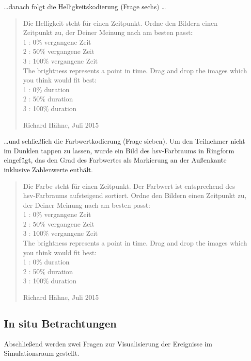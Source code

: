 \ldots danach folgt die Helligkeitskodierung (Frage sechs) \ldots
\blockquote[Richard Hähne, Juli 2015]{
Die Helligkeit steht für einen Zeitpunkt. Ordne den Bildern einen Zeitpunkt zu, der Deiner Meinung nach am besten passt:\\
1 : 0\% vergangene Zeit\\
2 : 50\% vergangene Zeit\\
3 : 100\% vergangene Zeit\\

The brightness represents a point in time. Drag and drop the images which you think would fit best:\\
1 : 0\% duration\\
2 : 50\% duration\\
3 : 100\% duration

}

\ldots und schließlich die Farbwertkodierung (Frage sieben). Um den Teilnehmer nicht im Dunklen tappen zu lassen, wurde ein Bild des \gls{hsv}-Farbraums in Ringform eingefügt, das den Grad des Farbwertes als Markierung an der Außenkante inklusive Zahlenwerte enthält.

\blockquote[Richard Hähne, Juli 2015]{
	Die Farbe steht für einen Zeitpunkt. Der Farbwert ist entsprechend des \gls{hsv}-Farbraums aufsteigend sortiert. Ordne den Bildern einen Zeitpunkt zu, der Deiner Meinung nach am besten passt:\\
	1 : 0\% vergangene Zeit\\
	2 : 50\% vergangene Zeit\\
	3 : 100\% vergangene Zeit\\
	
	The brightness represents a point in time. Drag and drop the images which you think would fit best:\\
	1 : 0\% duration\\
	2 : 50\% duration\\
	3 : 100\% duration
	
}

\subsection*{In situ Betrachtungen}\label{sec:umfrage:insitu}
Abschließend werden zwei Fragen zur Visualisierung der Ereignisse im Simulationsraum gestellt.

